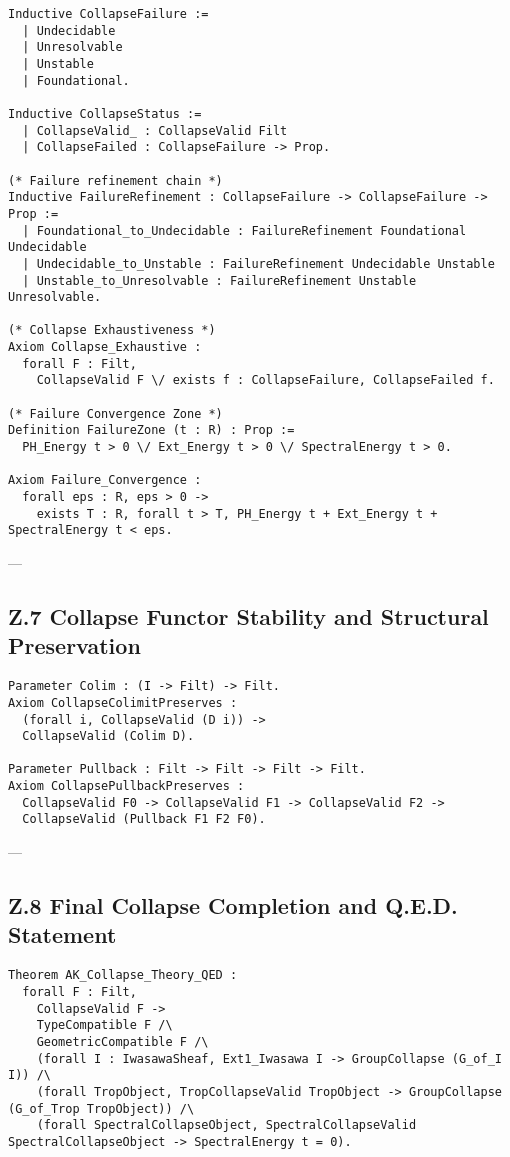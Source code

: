 \documentclass[11pt]{article}
\begin{document}
\begin{lstlisting}[language=Coq]
Inductive CollapseFailure :=
  | Undecidable
  | Unresolvable
  | Unstable
  | Foundational.

Inductive CollapseStatus :=
  | CollapseValid_ : CollapseValid Filt
  | CollapseFailed : CollapseFailure -> Prop.

(* Failure refinement chain *)
Inductive FailureRefinement : CollapseFailure -> CollapseFailure -> Prop :=
  | Foundational_to_Undecidable : FailureRefinement Foundational Undecidable
  | Undecidable_to_Unstable : FailureRefinement Undecidable Unstable
  | Unstable_to_Unresolvable : FailureRefinement Unstable Unresolvable.

(* Collapse Exhaustiveness *)
Axiom Collapse_Exhaustive :
  forall F : Filt,
    CollapseValid F \/ exists f : CollapseFailure, CollapseFailed f.

(* Failure Convergence Zone *)
Definition FailureZone (t : R) : Prop :=
  PH_Energy t > 0 \/ Ext_Energy t > 0 \/ SpectralEnergy t > 0.

Axiom Failure_Convergence :
  forall eps : R, eps > 0 ->
    exists T : R, forall t > T, PH_Energy t + Ext_Energy t + SpectralEnergy t < eps.
\end{lstlisting}

---

\subsection*{Z.7 Collapse Functor Stability and Structural Preservation}

\begin{lstlisting}[language=Coq]
Parameter Colim : (I -> Filt) -> Filt.
Axiom CollapseColimitPreserves :
  (forall i, CollapseValid (D i)) ->
  CollapseValid (Colim D).

Parameter Pullback : Filt -> Filt -> Filt -> Filt.
Axiom CollapsePullbackPreserves :
  CollapseValid F0 -> CollapseValid F1 -> CollapseValid F2 ->
  CollapseValid (Pullback F1 F2 F0).
\end{lstlisting}

---

\subsection*{Z.8 Final Collapse Completion and Q.E.D. Statement}

\begin{lstlisting}[language=Coq]
Theorem AK_Collapse_Theory_QED :
  forall F : Filt,
    CollapseValid F ->
    TypeCompatible F /\
    GeometricCompatible F /\
    (forall I : IwasawaSheaf, Ext1_Iwasawa I -> GroupCollapse (G_of_I I)) /\
    (forall TropObject, TropCollapseValid TropObject -> GroupCollapse (G_of_Trop TropObject)) /\
    (forall SpectralCollapseObject, SpectralCollapseValid SpectralCollapseObject -> SpectralEnergy t = 0).
\end{lstlisting}
\end{document}
